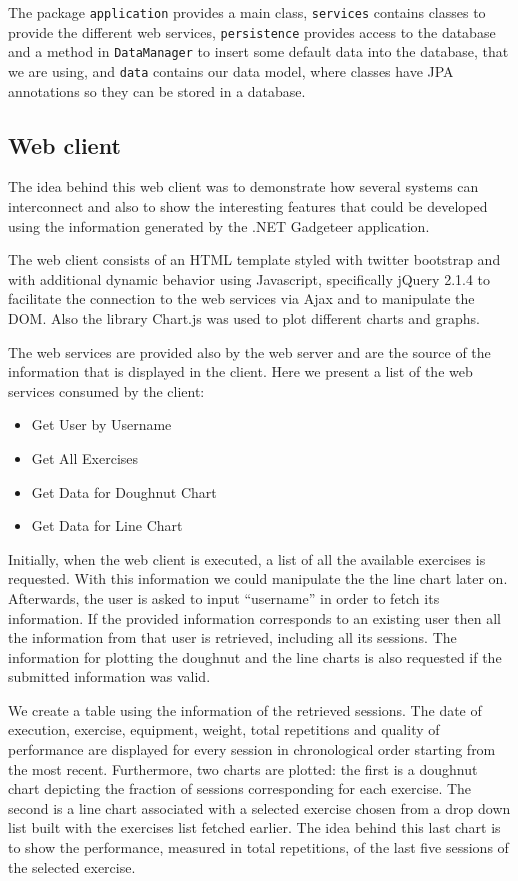 \documentclass{tk3-team}
\begin{document}
The package \texttt{application} provides a main class, \texttt{services} contains classes to provide the different web services, \texttt{persistence} provides access to the database and a method in \texttt{DataManager} to insert some default data into the database, that we are using, and \texttt{data} contains our data model, where classes have JPA annotations so they can be stored in a database.


\subsection{Web client}

The idea behind this web client was to demonstrate how several systems can interconnect and also to show the interesting features that could be developed using the information generated by the .NET Gadgeteer application. 

The web client consists of an HTML template styled with twitter bootstrap and with additional dynamic behavior using Javascript, specifically jQuery 2.1.4 to facilitate the connection to the web services via Ajax and to manipulate the DOM. Also the library Chart.js was used to plot different charts and graphs. 

The web services are provided also by the web server and are the source of the information that is displayed in the client. Here we present a list of the web services consumed by the client:

\begin{itemize}
	\item Get User by Username
	\item Get All Exercises
	\item Get Data for Doughnut Chart
	\item Get Data for Line Chart
\end{itemize}

Initially, when the web client is executed, a list of all the available exercises is requested. With this information we could manipulate the the line chart later on. Afterwards, the user is asked to input ``username'' in order to fetch its information. If the provided information corresponds to an existing user then all the information from that user is retrieved, including all its sessions. The information for plotting the doughnut and the line charts is also requested if the submitted information was valid.

We create a table using the information of the retrieved sessions. The date of execution, exercise, equipment, weight, total repetitions and quality of performance are displayed for every session in chronological order starting from the most recent. Furthermore, two charts are plotted: the first is a doughnut chart depicting the fraction of sessions corresponding for each exercise. The second is a line chart associated with a selected exercise chosen from a drop down list built with the exercises list fetched earlier. The idea behind this last chart is to show the performance, measured in total repetitions, of the last five sessions of the selected exercise.
\end{document}
